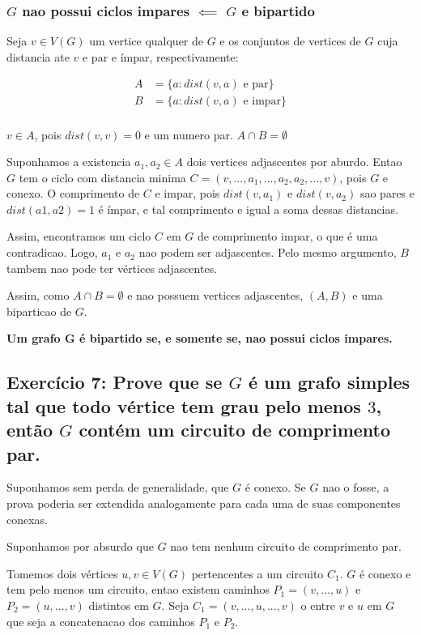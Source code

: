 \documentclass{article}
\begin{document}
\subsubsection{$G$ nao possui ciclos impares $\impliedby$ $G$ e bipartido}

Seja $v \in V(G)$  um vertice qualquer de $G$ e os conjuntos de vertices de $G$ cuja distancia ate $v$ e par e ímpar, respectivamente:

 \begin{align}
	A &= \{a : dist(v,a) \text{   e par}\} \\
	B&= \{a : dist(v,a) \text{   e impar}\} \\
\end{align}


$v \in A$, pois $dist(v,v) = 0$ e um numero par.
$A \cap B = \emptyset$

Suponhamos a existencia $a_1, a_2 \in A$ dois vertices adjascentes por aburdo. Entao $G$ tem o ciclo com distancia minima $C = (v, ..., a_1, ... ,a_2, a_2,...,v)$, pois $G$ e conexo. O comprimento de $C$ e impar, pois $dist(v, a_1)$ e $dist(v,a_2)$ sao pares e $dist(a1,a2) = 1$ é ímpar, e tal comprimento e igual a soma dessas distancias.

Assim, encontramos um ciclo $C$ em $G$ de comprimento impar, o que é uma contradicao. Logo, $a_1$ e $a_2$ nao podem ser adjascentes.
Pelo mesmo argumento, $B$ tambem nao pode ter vértices adjascentes.

Assim, como $A \cap B = \emptyset$ e nao possuem vertices adjascentes, $(A, B)$ e uma biparticao de $G$.

\textbf{Um grafo G é bipartido se, e somente se, nao possui ciclos impares.}

\clearpage

\subsection{Exercício 7: Prove que se $G$ é um grafo simples tal que todo vértice tem grau pelo menos $3$, então $G$ contém um circuito de comprimento par.}


Suponhamos sem perda de generalidade, que $G$ é conexo. Se $G$ nao o fosse, a prova poderia ser extendida analogamente para cada uma de suas componentes conexas.

Suponhamos por absurdo que $G$ nao tem nenhum circuito de comprimento par.



Tomemos dois vértices $u, v \in V(G)$ pertencentes a um circuito $C_1$. $G$ é conexo e tem pelo menos um circuito, entao existem caminhos $P_1 = (v, ..., u)$  e $P_2 = (u, ...,v)$ distintos em $G$. Seja $C_1 = (v, ..., u, ...,v)$ o entre $v$ e $u$ em $G$ que seja a concatenacao  dos caminhos $P_1$ e $P_2$.
\end{document}
